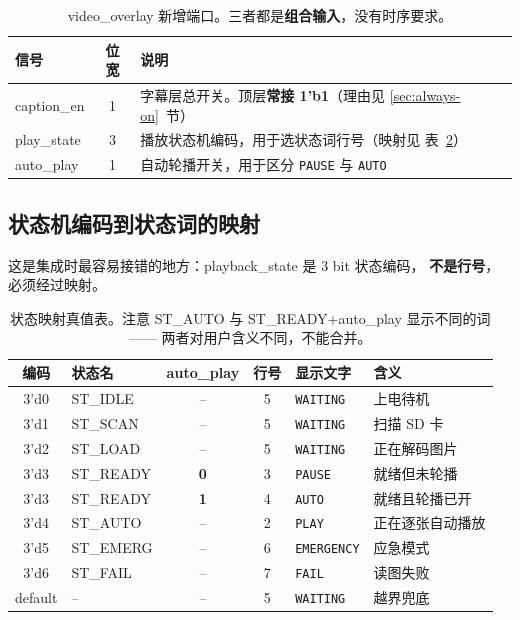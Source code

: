 \documentclass[10pt,a4paper]{article}
\newcommand{\sig}[1]{{\ttfamily\small #1}}
\newcommand{\tabref}[1]{表~\ref{#1}}
\newcommand{\code}[1]{{\ttfamily\small #1}}
\begin{document}
\begin{table}[htbp]
\centering\small
\caption{\sig{video\_overlay} 新增端口。三者都是\textbf{组合输入}，没有时序要求。}
\label{tab:ports-ovl}
\renewcommand{\arraystretch}{1.22}
\begin{tabularx}{\linewidth}{@{}l c X@{}}
\toprule
\textbf{信号} & \textbf{位宽} & \textbf{说明}\\
\midrule
\sig{caption\_en} & 1 & 字幕层总开关。顶层\textbf{常接 \code{1'b1}}（理由见 \ref{sec:always-on}~节）\\
\sig{play\_state} & 3 & 播放状态机编码，用于选状态词行号（映射见 \tabref{tab:statemap}）\\
\sig{auto\_play} & 1 & 自动轮播开关，用于区分 \texttt{PAUSE} 与 \texttt{AUTO}\\
\bottomrule
\end{tabularx}
\end{table}

\subsection{状态机编码到状态词的映射}
\label{sec:statemap}

这是集成时最容易接错的地方：\sig{playback\_state} 是 3 bit 状态编码，
\textbf{不是行号}，必须经过映射。

\begin{table}[htbp]
\centering\small
\caption{状态映射真值表。注意 \code{ST\_AUTO} 与 \code{ST\_READY+auto\_play} 显示不同的词——
两者对用户含义不同，不能合并。}
\label{tab:statemap}
\renewcommand{\arraystretch}{1.22}
\begin{tabular}{@{}c l c c l l@{}}
\toprule
\textbf{编码} & \textbf{状态名} & \textbf{auto\_play} & \textbf{行号} & \textbf{显示文字} & \textbf{含义}\\
\midrule
\code{3'd0} & \code{ST\_IDLE}   & -- & 5 & \texttt{WAITING}   & 上电待机\\
\code{3'd1} & \code{ST\_SCAN}   & -- & 5 & \texttt{WAITING}   & 扫描 SD 卡\\
\code{3'd2} & \code{ST\_LOAD}   & -- & 5 & \texttt{WAITING}   & 正在解码图片\\
\rowcolor{dsaccent!6}
\code{3'd3} & \code{ST\_READY}  & \textbf{0} & 3 & \texttt{PAUSE}     & 就绪但未轮播\\
\rowcolor{dsaccent!6}
\code{3'd3} & \code{ST\_READY}  & \textbf{1} & 4 & \texttt{AUTO}      & 就绪且轮播已开\\
\code{3'd4} & \code{ST\_AUTO}   & -- & 2 & \texttt{PLAY}      & 正在逐张自动播放\\
\code{3'd5} & \code{ST\_EMERG}  & -- & 6 & \texttt{EMERGENCY} & 应急模式\\
\code{3'd6} & \code{ST\_FAIL}   & -- & 7 & \texttt{FAIL}      & 读图失败\\
\code{default} & --             & -- & 5 & \texttt{WAITING}   & 越界兜底\\
\bottomrule
\end{tabular}
\end{table}
\end{document}
